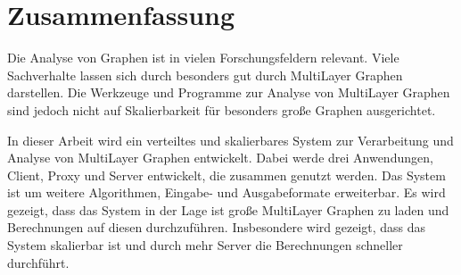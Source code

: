 
\section{Zusammenfassung}

Die Analyse von Graphen ist in vielen Forschungsfeldern relevant. Viele Sachverhalte lassen sich durch besonders gut durch MultiLayer Graphen darstellen.
Die Werkzeuge und Programme zur Analyse von MultiLayer Graphen sind jedoch nicht auf Skalierbarkeit für besonders große Graphen ausgerichtet. 

In dieser Arbeit wird ein verteiltes und skalierbares System zur Verarbeitung und Analyse von MultiLayer Graphen entwickelt. 
Dabei werde drei Anwendungen, Client, Proxy und Server entwickelt, die zusammen genutzt werden. Das System ist um weitere Algorithmen, Eingabe- und Ausgabeformate erweiterbar.
Es wird gezeigt, dass das System in der Lage ist große MultiLayer Graphen zu laden und Berechnungen auf diesen durchzuführen. Insbesondere wird gezeigt, dass das System skalierbar ist und durch mehr Server die Berechnungen schneller durchführt.
